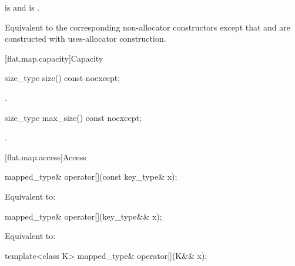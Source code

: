 \begin{itemdescr}
\pnum
\constraints
{} is  and
 is .

\pnum
\effects
Equivalent to the corresponding non-allocator constructors
except that  and  are constructed
with uses-allocator construction.
\end{itemdescr}

[flat.map.capacity]{Capacity}

%
\begin{itemdecl}
size_type size() const noexcept;
\end{itemdecl}

\begin{itemdescr}
\pnum
\returns
{}.
\end{itemdescr}

%
\begin{itemdecl}
size_type max_size() const noexcept;
\end{itemdecl}

\begin{itemdescr}
\pnum
\returns
{}.
\end{itemdescr}

[flat.map.access]{Access}

%
\begin{itemdecl}
mapped_type& operator[](const key_type& x);
\end{itemdecl}

\begin{itemdescr}
\pnum
\effects
Equivalent to: 
\end{itemdescr}

%
\begin{itemdecl}
mapped_type& operator[](key_type&& x);
\end{itemdecl}

\begin{itemdescr}
\pnum
\effects
Equivalent to: 
\end{itemdescr}

%
\begin{itemdecl}
template<class K> mapped_type& operator[](K&& x);
\end{itemdecl}


